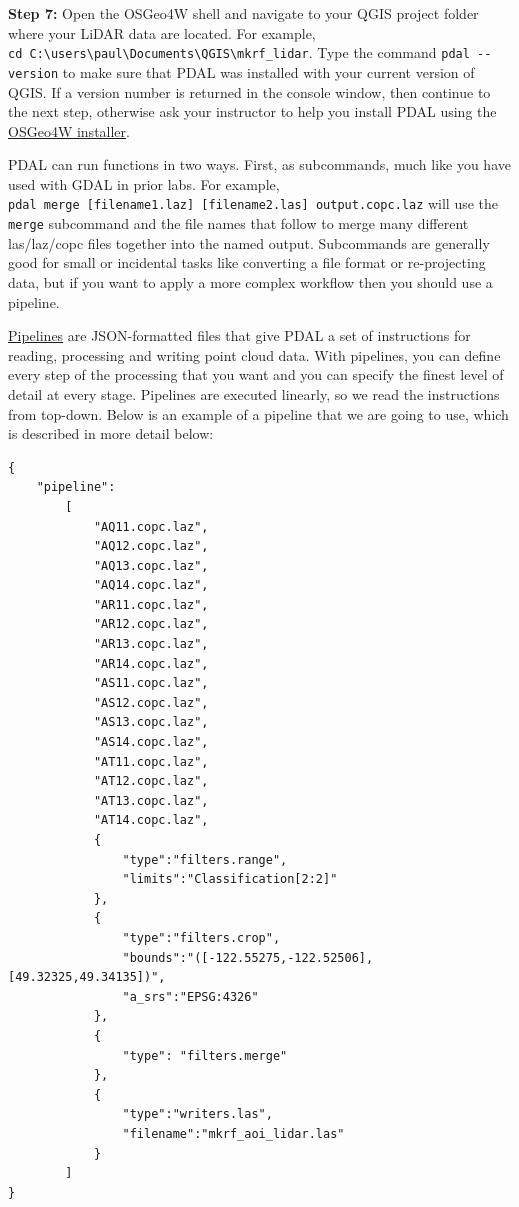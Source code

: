 \documentclass[
]{book}
\begin{document}
\textbf{Step 7:} Open the OSGeo4W shell and navigate to your QGIS project folder where your LiDAR data are located. For example, \texttt{cd\ C:\textbackslash{}users\textbackslash{}paul\textbackslash{}Documents\textbackslash{}QGIS\textbackslash{}mkrf\_lidar}. Type the command \texttt{pdal\ -\/-version} to make sure that PDAL was installed with your current version of QGIS. If a version number is returned in the console window, then continue to the next step, otherwise ask your instructor to help you install PDAL using the \href{https://trac.osgeo.org/osgeo4w}{OSGeo4W installer}.

PDAL can run functions in two ways. First, as subcommands, much like you have used with GDAL in prior labs. For example, \texttt{pdal\ merge\ {[}filename1.laz{]}\ {[}filename2.las{]}\ output.copc.laz} will use the \texttt{merge} subcommand and the file names that follow to merge many different las/laz/copc files together into the named output. Subcommands are generally good for small or incidental tasks like converting a file format or re-projecting data, but if you want to apply a more complex workflow then you should use a pipeline.

\href{https://pdal.io/en/2.6.0/pipeline.html\#pipeline}{Pipelines} are JSON-formatted files that give PDAL a set of instructions for reading, processing and writing point cloud data. With pipelines, you can define every step of the processing that you want and you can specify the finest level of detail at every stage. Pipelines are executed linearly, so we read the instructions from top-down. Below is an example of a pipeline that we are going to use, which is described in more detail below:

\begin{verbatim}
{
    "pipeline": 
        [
            "AQ11.copc.laz",
            "AQ12.copc.laz",
            "AQ13.copc.laz",
            "AQ14.copc.laz",
            "AR11.copc.laz",
            "AR12.copc.laz",
            "AR13.copc.laz",
            "AR14.copc.laz",
            "AS11.copc.laz",
            "AS12.copc.laz",
            "AS13.copc.laz",
            "AS14.copc.laz",    
            "AT11.copc.laz",
            "AT12.copc.laz",
            "AT13.copc.laz",
            "AT14.copc.laz",
            {
                "type":"filters.range",
                "limits":"Classification[2:2]"
            },
            {
                "type":"filters.crop",
                "bounds":"([-122.55275,-122.52506],[49.32325,49.34135])",
                "a_srs":"EPSG:4326"
            },
            {
                "type": "filters.merge"
            },
            {
                "type":"writers.las",
                "filename":"mkrf_aoi_lidar.las"
            }
        ]
}
\end{verbatim}
\end{document}

